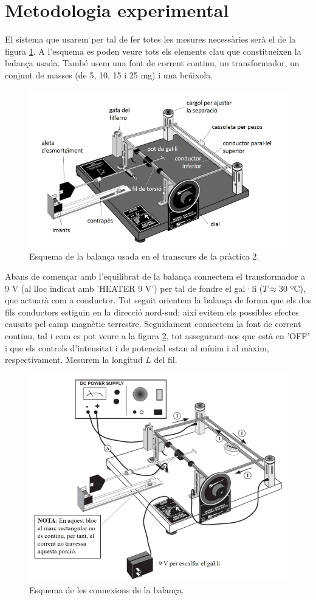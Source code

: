 \documentclass[a4paper,10.5pt]{report}
\begin{document}
\section{Metodologia experimental}

El sistema que usarem per tal de fer totes les mesures necessàries serà el de la figura \ref{fig:2.1}. A l'esquema es poden veure tots els elements clau que constitueixen la balança usada. També usem una font de corrent continu, un transformador, un conjunt de masses (de 5, 10, 15 i 25 mg) i una brúixola.

\begin{figure}[h]
	\centering
	\includegraphics[width=0.6\linewidth]{screenshot008}
	\caption{Esquema de la balança usada en el transcurs de la pràctica 2.}
	\label{fig:2.1}
\end{figure}

Abans de començar amb l'equilibrat de la balança connectem el transformador a 9 V (al lloc indicat amb 'HEATER 9 V') per tal de fondre el gal·li ($T \approx 30$ ºC), que actuarà com a conductor. Tot seguit orientem la balança de forma que els dos fils conductors estiguin en la direcció nord-sud; així evitem els possibles efectes causats pel camp magnètic terrestre. Seguidament connectem la font de corrent continu, tal i com es pot veure a la figura \ref{fig:2.2}, tot assegurant-nos que està en 'OFF' i que els controls d'intensitat i de potencial estan al mínim i al màxim, respectivament. Mesurem la longitud $L$ del fil.

\begin{figure}[h]
	\centering
	\includegraphics[width=0.6\linewidth]{screenshot009}
	\caption{Esquema de les connexions de la balança.}
	\label{fig:2.2}
\end{figure}
\end{document}

